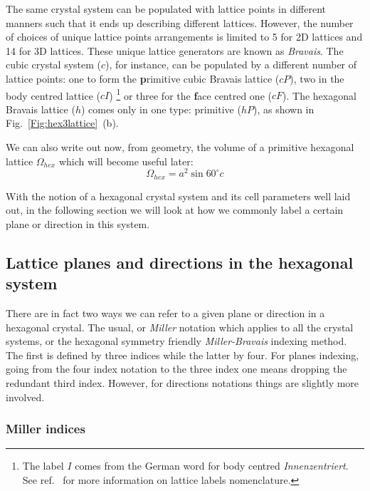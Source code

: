 The same crystal system can be populated with lattice points in different manners such that it ends up describing different lattices. However, the number of choices of unique lattice points arrangements is limited to 5 for 2D lattices and 14 for 3D lattices. These unique lattice generators are known as \textit{Bravais}. The cubic crystal system ($c$), for instance, can be populated by a different number of lattice points: one to form the \textbf{p}rimitive cubic Bravais lattice ($cP$), two in the body centred lattice ($cI$) \footnote{ The label $I$ comes from the German word for body centred \textit{Innenzentriert}. See ref.~\cite{Wolff85} for more information on lattice labels nomenclature.} or three for the \textbf{f}ace centred one ($cF$). The hexagonal Bravais lattice ($h$) comes only in one type: primitive ($hP$), as shown in Fig.~\ref{Fig:hex3lattice}~(b).  

We can also write out now, from geometry, the volume of a primitive hexagonal lattice $\Omega_{hex}$ which will become useful later:
\begin{equation}
\label{eq:UnitCellVolume}
\Omega_{hex} = a^2 \sin{60 ^{\circ}} c
\end{equation}

With the notion of a hexagonal crystal system and its cell parameters well laid out, in the following section we will look at how we commonly label a certain plane or direction in this system.



\subsection{Lattice planes and directions in the hexagonal system}
\label{sec:latMB}

There are in fact two ways we can refer to a given plane or direction in a hexagonal crystal. The usual, or \textit{Miller} notation which applies to all the crystal systems, or the hexagonal symmetry friendly \textit{Miller-Bravais} indexing method. The first is defined by three indices while the latter by four. For planes indexing, going from the four index notation to the three index one means dropping the redundant third index. However, for directions notations things are slightly more involved.

\subsubsection{Miller indices}

